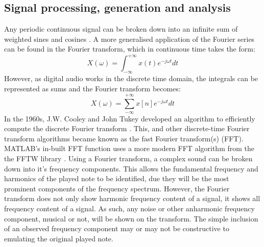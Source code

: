 \documentclass{article}
\begin{document}
    \subsection{Signal processing, generation and analysis}
        Any periodic continuous signal can be broken down into an infinite sum of weighted sines and cosines \cite{weisstein2004fourier}.
        A more generalised application of the Fourier series can be found in the Fourier transform, which in continuous time takes the form:
        \begin{equation}
            X(\omega) = \int_{-\infty}^{+\infty}x(t)e^{-j\omega t}dt
        \end{equation}
        However, as digital audio works in the discrete time domain, the integrals can be represented as sums and the Fourier transform becomes:
        \begin{equation}
            X(\omega) = \sum_{-\infty}^{+\infty}x[n]e^{-j\omega t}dt
        \end{equation}
        In the 1960s, J.W. Cooley and John Tukey developed an algorithm to efficiently compute the discrete Fourier transform \cite{cooley1965algorithm}.
        This, and other discrete-time Fourier transform algorithms became known as the fast Fourier transform(s) (FFT).
        MATLAB's in-built FFT function uses a more modern FFT algorithm from the the FFTW library \cite{frigo1998fftw}.
        Using a Fourier transform, a complex sound can be broken down into it's frequency components.
        This allows the fundamental frequency and harmonics of the played note to be identified, due they will be the most prominent components of the frequency spectrum.
        However, the Fourier transform does not only show harmonic frequency content of a signal, it shows all frequency content of a signal.
        As such, any noise or other anharmonic frequency component, musical or not, will be shown on the transform.
        The simple inclusion of an observed frequency component may or may not be constructive to emulating the original played note.
        
\end{document}
